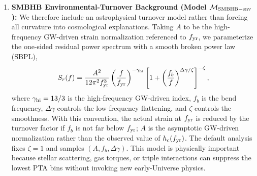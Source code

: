 \documentclass[symmetry,article,submit,pdftex,moreauthors]{Definitions/mdpi}
\begin{document}
\begin{enumerate}
    \item \textbf{SMBHB Environmental-Turnover Background (Model $\mathcal{M}_{\rm SMBHB-env}$):} We therefore include an astrophysical turnover model rather than forcing all curvature into cosmological explanations. Taking $A$ to be the high-frequency GW-driven strain normalization referenced to $f_{\rm yr}$, we parameterize the one-sided residual power spectrum with a smooth broken power law (SBPL),
    \begin{equation}\label{eq:sbpl}
        S_r(f)=\frac{A^2}{12\pi^2 f_{\mathrm{yr}}^3}\left(\frac{f}{f_{\mathrm{yr}}}\right)^{-\gamma_{\rm hi}}
        \left[1+\left(\frac{f_b}{f}\right)^{\Delta\gamma/\zeta}\right]^{-\zeta},
    \end{equation}
    where $\gamma_{\rm hi}=13/3$ is the high-frequency GW-driven index, $f_b$ is the bend frequency, $\Delta\gamma$ controls the low-frequency flattening, and $\zeta$ controls the smoothness. With this convention, the actual strain at $f_{\rm yr}$ is reduced by the turnover factor if $f_b$ is not far below $f_{\rm yr}$; $A$ is the asymptotic GW-driven normalization rather than the observed value of $h_c(f_{\rm yr})$. The default analysis fixes $\zeta=1$ and samples $(A,f_b,\Delta\gamma)$. This model is physically important because stellar scattering, gas torques, or triple interactions can suppress the lowest PTA bins without invoking new early-Universe physics.
    

\end{enumerate}
\end{document}
